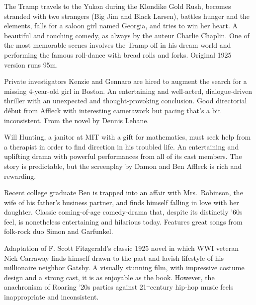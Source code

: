    The Tramp travels to the Yukon during the Klondike Gold Rush, becomes stranded with two strangers (Big Jim and Black Larsen), battles hunger and the elements, falls for a saloon girl named Georgia, and tries to win her heart. A beautiful and touching comedy, as always by the auteur Charlie Chaplin. One of the most memorable scenes involves the Tramp off in his dream world and performing the famous roll-dance with bread rolls and forks. Original 1925 version runs 95m. \author{AW}

   Private investigators Kenzie and Gennaro are hired to augment the search for a missing 4-year-old girl in Boston. An entertaining and well-acted, dialogue-driven thriller with an unexpected and thought-provoking conclusion. Good directorial d\'ebut from Affleck with interesting camerawork but pacing that's a bit inconsistent. From the novel by Dennis Lehane.  \author{DW} 

   Will Hunting, a janitor at MIT with a gift for mathematics, must seek help from a therapist in order to find direction in his troubled life. An entertaining and uplifting drama with powerful performances from all of its cast members. The story is predictable, but the screenplay by Damon and Ben Affleck is rich and rewarding. \author{DW} 

\iffalse
\movie{Goodfellas}{1990}{146m}{\four} \dir{Martin Scorsese}
\fi

   Recent college graduate Ben is trapped into an affair with Mrs.\ Robinson, the wife of his father's business partner, and finds himself falling in love with her daughter. Classic coming-of-age comedy-drama that, despite its distinctly '60s feel, is nonetheless entertaining and hilarious today. Features great songs from folk-rock duo Simon and Garfunkel. \author{DW} 

   Adaptation of F. Scott Fitzgerald's classic 1925 novel in which WWI veteran Nick Carraway finds himself drawn to the past and lavish lifestyle of his millionaire neighbor Gatsby. A visually stunning film, with impressive costume design and a strong cast, it is as enjoyable as the book. However, the anachronism of Roaring '20s parties against 21\st\ century hip-hop music feels inappropriate and inconsistent. \author{DW} 

